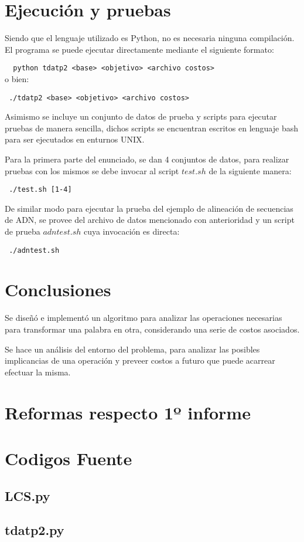 \documentclass[12pt]{article}
\begin{document}
\newpage
\section{Ejecución y pruebas}
	Siendo que el lenguaje utilizado es Python, no es necesaria ninguna 
	compilación. El programa se puede ejecutar directamente mediante el 
	siguiente formato:
	
	\verb#  python tdatp2 <base> <objetivo> <archivo costos>#
	\\o bien: 
	
	\verb# ./tdatp2 <base> <objetivo> <archivo costos>#
	
	Asimismo se incluye un conjunto de datos de prueba y scripts para 
	ejecutar pruebas de manera sencilla, dichos scripts se encuentran 
	escritos en lenguaje bash para ser ejecutados en enturnos UNIX.
	
	Para la primera parte del enunciado, se dan 4 conjuntos de datos, 
	para realizar pruebas con los mismos se debe invocar al script $test.sh$ 
	de la siguiente manera:
	
	\verb# ./test.sh [1-4]#
	
	De similar modo para ejecutar la prueba del ejemplo de alineación de
	secuencias de ADN, se provee del archivo de datos mencionado con 
	anterioridad y un script de prueba $adntest.sh$ cuya invocación es directa:
	
	\verb# ./adntest.sh#
	
\newpage
\section{Conclusiones}
	Se diseñó e implementó un algoritmo para analizar las operaciones 
	necesarias para transformar una palabra en otra, considerando una
	serie de costos asociados.
	
	Se hace un análisis del entorno del problema, para analizar las 
	posibles implicancias de una operación y preveer costos a futuro
	que puede acarrear efectuar la misma.

\newpage
\section{Reformas respecto 1º informe}

\newpage
\section{Codigos Fuente}\label{sec:sourcecode}
\subsection{LCS.py}\label{subsec:lcs}


\newpage
\subsection{tdatp2.py}\label{subsec:tdatp2}

\end{document}
